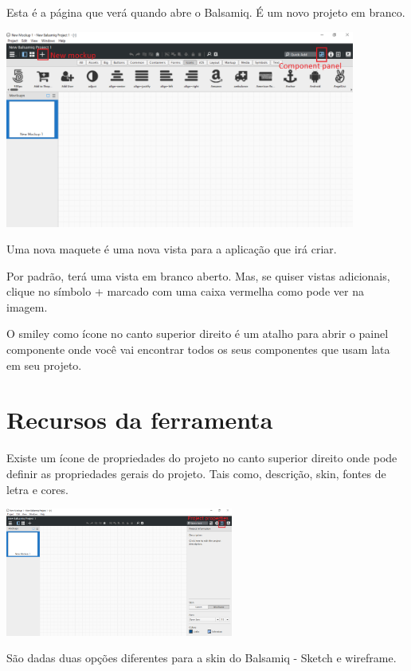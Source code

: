 \documentclass{tufte-book} %
\begin{document}
Esta é a página que verá quando abre o Balsamiq. É um novo projeto em branco.

\begin{center}
	\includegraphics[width=11.50cm]{img4.png}
\end{center}

Uma nova maquete é uma nova vista para a aplicação que irá criar.

Por padrão, terá uma vista em branco aberto. Mas, se quiser vistas adicionais, clique no símbolo + marcado com uma caixa vermelha como pode ver na imagem.

O smiley como ícone no canto superior direito é um atalho para abrir o painel componente onde você vai encontrar todos os seus componentes que usam lata em seu projeto.

\chapter{Recursos da ferramenta}

Existe um ícone de propriedades do projeto no canto superior direito onde pode definir as propriedades gerais do projeto. Tais como, descrição, skin, fontes de letra e cores.

\begin{center}
	\includegraphics[width=7.50cm]{img5.png}
\end{center}

São dadas duas opções diferentes para a skin do Balsamiq - Sketch e wireframe.
\end{document}
